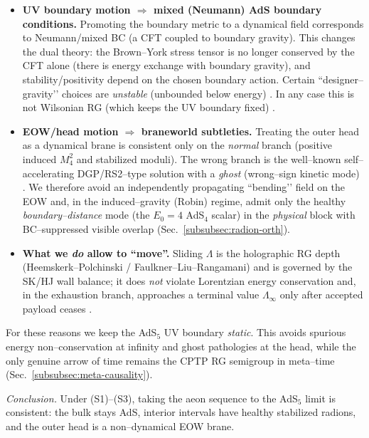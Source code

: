 \documentclass[10pt]{article}
\theoremstyle{definition}
\theoremstyle{plain}
\begin{document}
\begin{itemize}[leftmargin=1.4em]
\item \textbf{UV boundary motion $\Rightarrow$ mixed (Neumann) AdS boundary conditions.}
Promoting the boundary metric to a dynamical field corresponds to Neumann/mixed BC (a CFT coupled to boundary gravity). This changes the dual theory: the Brown–York stress tensor is no longer conserved by the CFT alone (there is energy exchange with boundary gravity), and stability/positivity depend on the chosen boundary action. Certain “designer–gravity’’ choices are \emph{unstable} (unbounded below energy) \cite{CompereMarolf2008,HertogHorowitz2004,BalasubramanianKraus1999}. In any case this is not Wilsonian RG (which keeps the UV boundary fixed) \cite{HeemskerkPolchinski2011,FaulknerLiuRangamani2011}.
\item \textbf{EOW/head motion $\Rightarrow$ braneworld subtleties.}
Treating the outer head as a dynamical brane is consistent only on the \emph{normal} branch (positive induced $M_4^2$ and stabilized moduli). The wrong branch is the well–known self–accelerating DGP/RS2–type solution with a \emph{ghost} (wrong–sign kinetic mode) \cite{LutyPorratiRattazzi2003,Koyama2005}. We therefore avoid an independently propagating “bending’’ field on the EOW and, in the induced–gravity (Robin) regime, admit only the healthy \emph{boundary–distance} mode (the $E_0\!=\!4$ AdS$_4$ scalar) in the \emph{physical} block with BC–suppressed visible overlap (Sec.~\ref{subsubsec:radion-orth}).
\item \textbf{What we \emph{do} allow to “move”.}
Sliding $\Lambda$ is the holographic RG depth (Heemskerk–Polchinski / Faulkner–Liu–Rangamani) and is governed by the SK/HJ wall balance; it does \emph{not} violate Lorentzian energy conservation and, in the exhaustion branch, approaches a terminal value $\Lambda_\infty$ only after accepted payload ceases \cite{HeemskerkPolchinski2011,FaulknerLiuRangamani2011}.
\end{itemize}

\noindent
For these reasons we keep the AdS$_5$ UV boundary \emph{static}. This avoids spurious energy non–conservation at infinity and ghost pathologies at the head, while the only genuine arrow of time remains the CPTP RG semigroup in meta–time (Sec.~\ref{subsubsec:meta-causality}).


\medskip
\noindent
\emph{Conclusion.} Under (S1)–(S3), taking the aeon sequence to the AdS$_5$ limit is consistent: the bulk stays AdS, interior intervals have healthy stabilized radions, and the outer head is a non–dynamical EOW brane.
\end{document}

